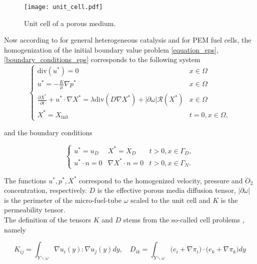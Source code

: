 \documentclass{article}
\begin{document}
\begin{figure}[h]
\centering
\texttt{[image: unit\_cell.pdf]}
\caption{Unit cell of a porous medium.}\label{unit_cell}
\end{figure}

Now according to \cite{hornung1997homogenization,hornung1991diffusion} for general heterogeneous catalysis and \cite{schmuck2013homogenization} for PEM fuel cells, the homogenization of the initial boundary value problem \eqref{equation_eps},\eqref{boundary_conditions_eps} corresponds to the following system 
\begin{equation}
\label{equation_homo}
\left\{
\begin{array}{ll}
\mbox{div}(u^*)=0 & x\in \Omega\\
u^*= -\frac{K}{\mu} \nabla p^* & x\in \Omega\\
\frac{\partial X^*}{\partial t}+ u^*\cdot \nabla  X^*=\lambda \mbox{div} (D \nabla X^*) +|\partial \omega| \mathcal{R}(X^*) & x\in \Omega\\
X^* =X_{\text{init}} & t=0, x\in \Omega,
\end{array}
\right.
\end{equation}

and the boundary conditions

\begin{equation}
\label{boundary_conditions_homo}
\left\{
\begin{array}{lll}
u^*=u_D & X^*=X_D & t>0,x\in \Gamma_D,\\
u^*\cdot n=0 & \nabla X^* \cdot n=0 & t>0, x\in \Gamma_N.
\end{array}
\right.
\end{equation}

The functions $u^*,p^*,X^*$ correspond to the homogenized velocity, pressure and $O_2$ concentration, respectively. 
$D$ is the effective porous media diffusion tensor, $|\partial \omega|$ is the perimeter of the micro-fuel-tube $\omega$ scaled to the unit cell and $K$ is the permeability tensor.\\ 




The definition of the tensors $K$ and $D$ stems from the so-called cell problems \cite{hornung1997homogenization}, namely 

\begin{equation}
\label{def:tensors}
K_{ij}=\int_{Y\backslash \omega}\nabla u_i(y) : \nabla u_j(y)dy, \quad D_{ik}=
\int_{Y\backslash \omega}\Big(e_i+\nabla \pi_i\Big)\cdot \Big(e_k+\nabla \pi_k\Big) dy
\end{equation}
\end{document}
